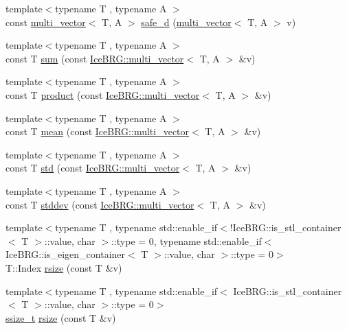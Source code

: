 \begin{DoxyCompactItemize}
{\footnotesize template$<$typename T , typename A $>$ }\\const \hyperlink{classIceBRG_1_1multi__vector}{multi\-\_\-vector}$<$ T, A $>$ \hyperlink{namespaceIceBRG_a6a42ffe9a64197dfc458f9e5ff648ce2}{safe\-\_\-d} (\hyperlink{classIceBRG_1_1multi__vector}{multi\-\_\-vector}$<$ T, A $>$ v)
\item 
{\footnotesize template$<$typename T , typename A $>$ }\\const T \hyperlink{namespaceIceBRG_a506ce09b9b1cefbe1bd3b8e062a8938b}{sum} (const \hyperlink{classIceBRG_1_1multi__vector}{Ice\-B\-R\-G\-::multi\-\_\-vector}$<$ T, A $>$ \&v)
\item 
{\footnotesize template$<$typename T , typename A $>$ }\\const T \hyperlink{namespaceIceBRG_a631ab58f518c17b99a3e2d1c2d022830}{product} (const \hyperlink{classIceBRG_1_1multi__vector}{Ice\-B\-R\-G\-::multi\-\_\-vector}$<$ T, A $>$ \&v)
\item 
{\footnotesize template$<$typename T , typename A $>$ }\\const T \hyperlink{namespaceIceBRG_a31912d66a78938bcc3e0fdbc917c5eec}{mean} (const \hyperlink{classIceBRG_1_1multi__vector}{Ice\-B\-R\-G\-::multi\-\_\-vector}$<$ T, A $>$ \&v)
\item 
{\footnotesize template$<$typename T , typename A $>$ }\\const T \hyperlink{namespaceIceBRG_a97e1636544e3bdcfc71f53292e1c3df3}{std} (const \hyperlink{classIceBRG_1_1multi__vector}{Ice\-B\-R\-G\-::multi\-\_\-vector}$<$ T, A $>$ \&v)
\item 
{\footnotesize template$<$typename T , typename A $>$ }\\const T \hyperlink{namespaceIceBRG_a9db49a32658ae04d4e5780e90c58ae15}{stddev} (const \hyperlink{classIceBRG_1_1multi__vector}{Ice\-B\-R\-G\-::multi\-\_\-vector}$<$ T, A $>$ \&v)
\item 
{\footnotesize template$<$typename T , typename std\-::enable\-\_\-if$<$!\-Ice\-B\-R\-G\-::is\-\_\-stl\-\_\-container$<$ T $>$\-::value, char $>$\-::type  = 0, typename std\-::enable\-\_\-if$<$ Ice\-B\-R\-G\-::is\-\_\-eigen\-\_\-container$<$ T $>$\-::value, char $>$\-::type  = 0$>$ }\\T\-::\-Index \hyperlink{namespaceIceBRG_a94a21bbd3c82f3ddd3761ca9823ff566}{rsize} (const T \&v)
\item 
{\footnotesize template$<$typename T , typename std\-::enable\-\_\-if$<$ Ice\-B\-R\-G\-::is\-\_\-stl\-\_\-container$<$ T $>$\-::value, char $>$\-::type  = 0$>$ }\\\hyperlink{lib_2IceBRG__main_2common_8h_ab322a3e50421dc5f0c43316b1b373592}{ssize\-\_\-t} \hyperlink{namespaceIceBRG_aefb05b16dc7a6741f629c5157871f849}{rsize} (const T \&v)

\end{DoxyCompactItemize}
